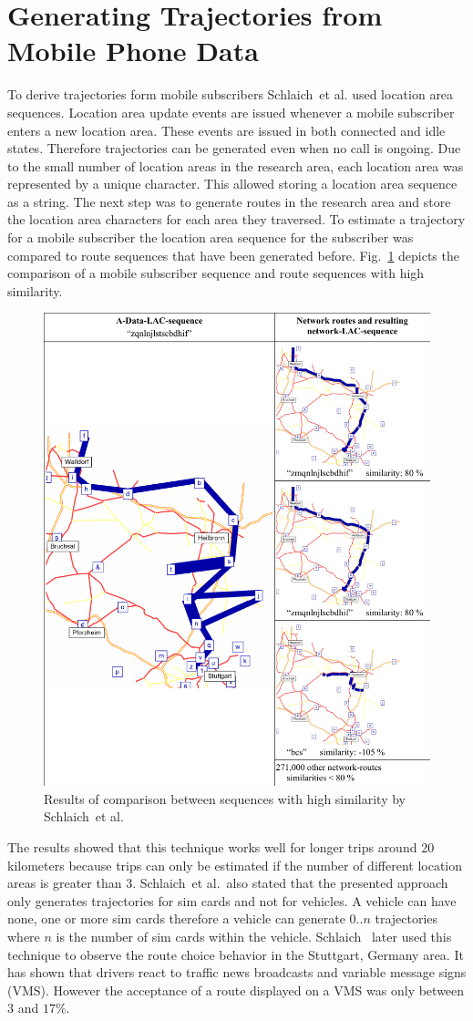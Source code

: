 \documentclass[master,english]{hgbthesis}
\begin{document}
\section{Generating Trajectories from Mobile Phone Data}
To derive trajectories form mobile subscribers Schlaich~et al. \cite{Schlaich2010a} used location area sequences. Location area update events are issued whenever a mobile subscriber enters a new location area. These events are issued in both connected and idle states. Therefore trajectories can be generated even when no call is ongoing. Due to the small number of location areas in the research area, each location area was represented by a unique character. This allowed storing a location area sequence as a string. The next step was to generate routes in the research area and store the location area characters for each area they traversed. To estimate a trajectory for a mobile subscriber the location area sequence for the subscriber was compared to route sequences that have been generated before. Fig.\ \ref{fig:schlaichcomp} depicts the comparison of a mobile subscriber sequence and route sequences with high similarity.
\begin{figure}
\centering
\includegraphics[width=0.7\linewidth]{schlaichcomp.pdf}
\caption{Results of comparison between sequences with high similarity by Schlaich~et al.\ \cite{Schlaich2010a}}
\label{fig:schlaichcomp}
\end{figure}
The results showed that this technique works well for longer trips around 20 kilometers because trips can only be estimated if the number of different location areas is greater than 3. Schlaich~et al.\ also stated that the presented approach only generates trajectories for sim cards and not for vehicles. A vehicle can have none, one or more sim cards therefore a vehicle can generate $0..n$ trajectories where $n$ is the number of sim cards within the vehicle.
Schlaich~\cite{Schlaich2010} later used this technique to observe the route choice behavior in the Stuttgart, Germany area. It has shown that drivers react to traffic news broadcasts and variable message signs (VMS). However the acceptance of a route displayed on a VMS was only between $3$ and $17\%$.
\end{document}
